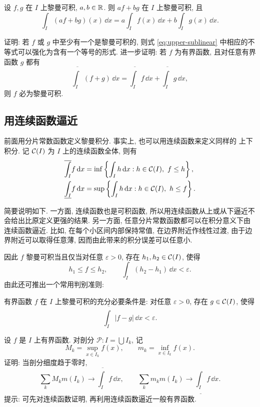 \begin{thm}[黎曼积分的线性性]
	设 \(f,g\) 在 \(I\) 上黎曼可积, \(a,b\in\mathbb{R}\). 则 \(af+bg\) 在 \(I\) 上黎曼可积, 且
	\[
	\int_I(af+bg)(x)\,\dd x
	=a\int_I f(x)\,\dd x+b\int_I g(x)\,\dd x.
	\]
\end{thm}

\begin{exer}
	证明: 若 \(f\) 或 \(g\) 中至少有一个是黎曼可积的, 则式
	\eqref{eq:upper-sublinear} 中相应的不等式可以强化为含有一个等号的形式.
	进一步证明: 若 \(f\) 为有界函数, 且对任意有界函数 \(g\) 都有
	\[
	\overline{\int_I}(f+g)\,\dd x
	=\overline{\int_I}f\,\dd x+
	\overline{\int_I}g\,\dd x,
	\]
	则 \(f\) 必为黎曼可积.
\end{exer}

\subsection{用连续函数逼近}

前面用分片常数函数定义黎曼积分. 事实上, 也可以用连续函数来定义同样的
上下积分. 记 \(\mathcal{C}(I)\) 为 \(I\) 上的连续函数全体, 则有
\begin{align*}
	\overline{\int_I} f\,\dd x
	&=\inf\left\{\int_I h\,\dd x: h\in\mathcal{C}(I),\ f\leq h\right\},\\
	\underline{\int_I} f\,\dd x
	&=\sup\left\{\int_I h\,\dd x: h\in\mathcal{C}(I),\ h\leq f\right\}.
\end{align*}

简要说明如下. 一方面, 连续函数也是可积函数, 所以用连续函数从上或从下逼近不会给出比原定义更强的结果. 另一方面, 任意分片常数函数都可以在积分意义下由连续函数逼近. 比如, 在每个小区间内部保持常值, 在边界附近作线性过渡, 由于边界附近可以取得任意薄, 因而由此带来的积分误差可以任意小.

因此 \(f\) 黎曼可积当且仅当对任意 \(\varepsilon>0\), 存在
\(h_1,h_2\in\mathcal{C}(I)\), 使得
\[
h_1\leq f\leq h_2,
\qquad
\int_I(h_2-h_1)\,\dd x<\varepsilon.
\]
由此还可推出一个常用判别准则:

\begin{prop}
	有界函数 \(f\) 在 \(I\) 上黎曼可积的充分必要条件是: 对任意
	\(\varepsilon>0\), 存在 \(g\in\mathcal{C}(I)\), 使得
	\[
	\overline{\int_I}|f-g|\,\dd x<\varepsilon.
	\]
\end{prop}

\begin{exer}[Darboux 定理]
	设 \(f\) 是 \(I\) 上有界函数. 对剖分 \(\mathcal{P}: I=\bigcup I_k\), 记
	\[
	M_k=\sup_{x\in I_k}f(x),\qquad m_k=\inf_{x\in I_k}f(x).
	\]
	证明: 当剖分细度趋于零时,
	\[
	\sum_k M_km(I_k)\longrightarrow \overline{\int_I} f\,\dd x,
	\qquad
	\sum_k m_km(I_k)\longrightarrow \underline{\int_I} f\,\dd x.
	\]
	提示: 可先对连续函数证明, 再利用连续函数逼近一般有界函数.
\end{exer}

